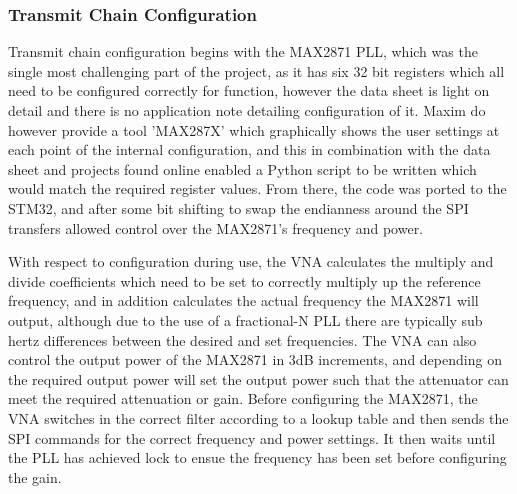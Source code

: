 \newpage
\subsubsection{Transmit Chain Configuration}
Transmit chain configuration begins with the MAX2871 PLL, which was the single most challenging part of the project, as it has six 32 bit registers which all need to be configured correctly for function, however the data sheet is light on detail and there is no application note detailing configuration of it. Maxim do however provide a tool 'MAX287X' which graphically shows the user settings at each point of the internal configuration, and this in combination with the data sheet and projects found online \cite{max2871_trans} \cite{max2871_synth} enabled a Python script to be written which would match the required register values. From there, the code was ported to the STM32, and after some bit shifting to swap the endianness around the SPI transfers allowed control over the MAX2871's frequency and power. 

With respect to configuration during use, the VNA calculates the multiply and divide coefficients which need to be set to correctly multiply up the reference frequency, and in addition calculates the actual frequency the MAX2871 will output, although due to the use of a fractional-N PLL there are typically sub hertz differences between the desired and set frequencies. The VNA can also control the output power of the MAX2871 in 3dB increments, and depending on the required output power will set the output power such that the attenuator can meet the required attenuation or gain. Before configuring the MAX2871, the VNA switches in the correct filter according to a lookup table and then sends the SPI commands for the correct frequency and power settings. It then waits until the PLL has achieved lock to ensue the frequency has been set before configuring the gain. 

